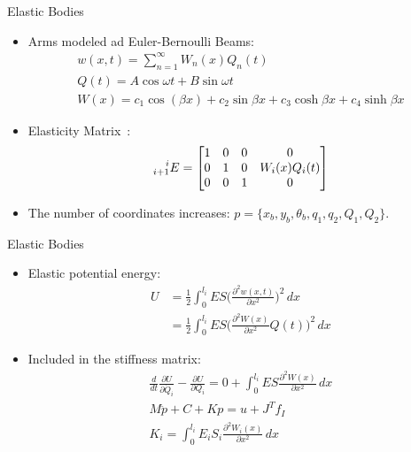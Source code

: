 \begin{frame}{Elastic Bodies}
  \begin{itemize}
    \item Arms modeled ad Euler-Bernoulli Beams:
    \begin{equation}
      \begin{array}{c}
      w(x,t)=\sum_{n=1}^\infty W_n(x)Q_n(t)\\
      Q(t)=A\cos{\omega t}+B\sin{\omega t}\\
      W(x)=c_1\cos(\beta x)+c_2\sin{\beta x}+c_3\cosh{\beta x}+c_4\sinh{\beta x}
      \end{array}
    \end{equation}
    \item Elasticity Matrix~\cite{elasticity}:
    \begin{equation}
      \prescript{i}{i+1}{E}=\begin{bmatrix}
        1&0&0&0\\
        0&1&0&W_i(x)Q_i(t)\\
        0&0&1&0
      \end{bmatrix}
    \end{equation}
    \item The number of coordinates increases: $p=\{x_b,y_b,\theta_b,q_1,q_2,Q_1,Q_2\}$.
  \end{itemize}
\end{frame}

\begin{frame}{Elastic Bodies}
  \begin{itemize}
    \item Elastic potential energy: 
    \begin{equation}
      \begin{split}
      U&=\frac{1}{2}\int_{0}^{l_i}ES\Big(\frac{\partial^2 w(x,t)}{\partial x^2}\Big)^2\,dx\\
       &=\frac{1}{2}\int_{0}^{l_i}ES\Big(\frac{\partial^2 W(x)}{\partial x^2}Q(t)\Big)^2\,dx
      \end{split}
    \end{equation}
    \item Included in the stiffness matrix:
    \begin{equation}
      \begin{array}{c}
        \frac{d}{dt}\frac{\partial U}{\partial \dot{Q}_i}-\frac{\partial U}{\partial Q_i}=0+\int_{0}^{l_i}ES\frac{\partial^2 W(x)}{\partial x^2}\,dx\\
        M\ddot{p}+C+Kp=u+J^Tf_I\\
        K_i=\int_{0}^{l_i}E_iS_i\frac{\partial^2 W_i(x)}{\partial x^2}\,dx
      \end{array}
    \end{equation}
  \end{itemize}
\end{frame}

